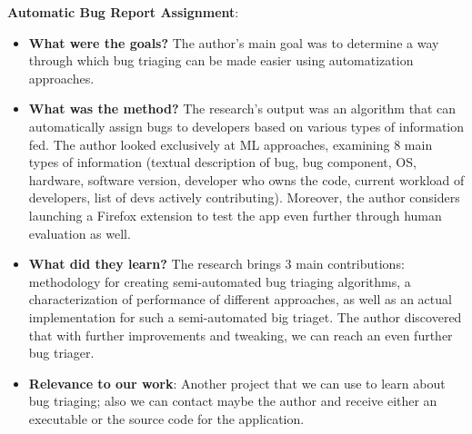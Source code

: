 \documentclass{mprop}
\begin{document}
\textbf{Automatic Bug Report Assignment}\cite{anvik2006automating}:
\begin{itemize}
  \item \textbf{What were the goals?}
    The author’s main goal was to determine a way through which bug triaging can be made 
    easier using automatization approaches. 
  \item \textbf{What was the method?}
    The research’s output was an algorithm that can automatically assign bugs to developers based on various types of information fed. The author looked exclusively at ML approaches, examining 8 main types of information (textual description of bug, bug component, OS, hardware, software version, developer who owns the code, current workload of developers, list of devs actively contributing). Moreover, the author considers launching a Firefox extension to test the app even further through human evaluation as well. 
  \item \textbf{What did they learn?}
  The research brings 3 main contributions: methodology for creating semi-automated bug triaging algorithms, a characterization of performance of different approaches, as well as an actual implementation for such a semi-automated big triaget. The author discovered that with further improvements and tweaking, we can reach an even further bug triager.   
  \item \textbf{Relevance to our work}:
  Another project that we can use to learn about bug triaging; also we can contact maybe the author and receive either an executable or the source code for the application. 
\end{itemize}
\end{document}
